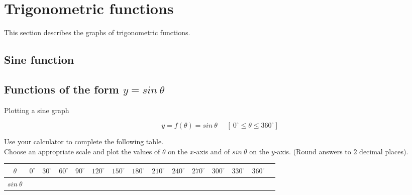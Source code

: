 \section{Trigonometric functions}
This section describes the graphs of trigonometric functions.\par 
{}
\subsection{Sine function}
\subsection*{Functions of the form $y=sin~\theta$}
\begin{wex}
{Plotting a sine graph}
{
\begin{equation*}
  y = f(\theta) = sin~\theta~~~~~~[~0^{\circ} \leq \theta \leq 360^{\circ}]
\end{equation*}


Use your calculator to complete the following table. \\
Choose an appropriate scale and plot the values of $\theta $ on the $x$-axis and of $sin~\theta $ on the $y$-axis. (Round answers to $2$ decimal places). 


\begin{table}[H]


\begin{tabular}{|c|m{0.3cm}|m{0.4cm}|m{0.4cm}|m{0.4cm}|m{0.5cm}|m{0.5cm}|m{0.5cm}|m{0.5cm}|m{0.5cm}|m{0.5cm}|m{0.5cm}|m{0.5cm}|m{0.5cm}|} \hline

\footnotesize$\theta $&
\footnotesize$0^{\circ }$&
\footnotesize$30^{\circ }$&
\footnotesize$60^{\circ }$&
\footnotesize$90^{\circ }$&
\footnotesize$120^{\circ }$&
\footnotesize$150^{\circ }$&
\footnotesize$180^{\circ }$&
\footnotesize$210^{\circ }$&
\footnotesize$240^{\circ }$&
\footnotesize$270^{\circ }$&
\footnotesize$300^{\circ }$&
\footnotesize$330^{\circ }$&
\footnotesize$360^{\circ }$
\\ \hline

\footnotesize$sin~\theta$&
&
&
&
&
&
&
&
&
&
&
&
&
&

 \hline
\end{tabular}


\end{table}}
\end{wex}
